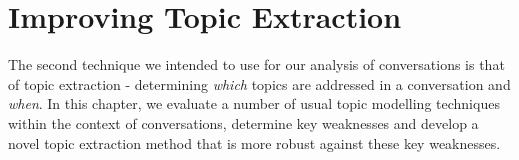 \chapter[Topic Extraction]{Improving Topic Extraction}
The second technique we intended to use for our analysis of conversations is that of topic extraction - determining \textit{which} topics are addressed in a conversation and \textit{when}. In this chapter, we evaluate a number of usual topic modelling techniques within the context of conversations, determine key weaknesses and develop a novel topic extraction method that is more robust against these key weaknesses.






\glsresetall